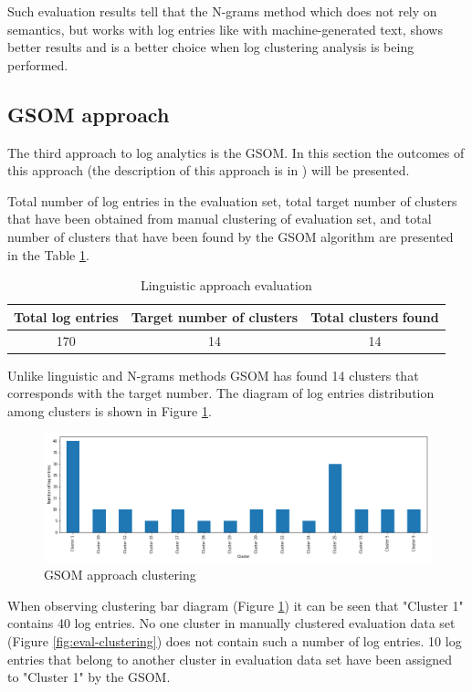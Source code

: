 \documentclass[thesis=M,english]{FITthesis}[2019/12/23]
\begin{document}
Such evaluation results tell that the N-grams method which does not rely on semantics, but works with log entries like with machine-generated text, shows better results and is a better choice when log clustering analysis is being performed.

\subsection{GSOM approach}
The third approach to log analytics is the GSOM. In this section the outcomes of this approach (the description of this approach is in %
)
will be presented.


Total number of log entries in the evaluation set, total target number of clusters that have been obtained from manual clustering of evaluation set, and total number of clusters that have been found by the GSOM algorithm are presented in the Table \ref{tab:evaluation-conditions-gsom}.

\begin{table}[h!]\centering
	\caption{Linguistic approach evaluation}\label{tab:evaluation-conditions-gsom}
	\begin{tabular}{ |c|c|c| }
		\hline
		\textbf{Total log entries} & \textbf{Target number of clusters} & \textbf{Total clusters found}\\
		\hline
		170 & 14 & 14 \\
		\hline
	\end{tabular}
\end{table}

Unlike linguistic and N-grams methods GSOM has found 14 clusters that corresponds with the target number. The diagram of log entries distribution among clusters is shown in Figure \ref{fig:eval-clustering-gsom}.

\begin{figure}[h!]\centering
	\includegraphics[scale=0.34]{gsom_eval}
	\caption{GSOM approach clustering}\label{fig:eval-clustering-gsom}
\end{figure}

When observing clustering bar diagram (Figure \ref{fig:eval-clustering-gsom}) it can be seen that "Cluster 1" contains 40 log entries. No one cluster in manually clustered evaluation data set (Figure \ref{fig:eval-clustering}) does not contain such a number of log entries. 10 log entries that belong to another cluster in evaluation data set have been assigned to "Cluster 1" by the GSOM.
\end{document}
